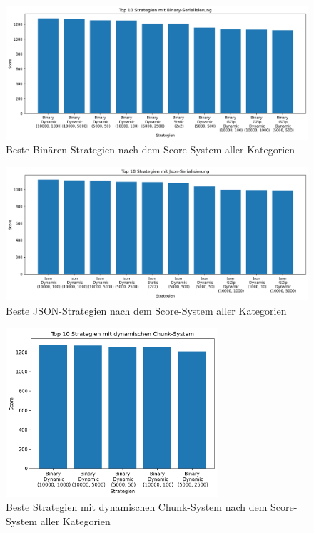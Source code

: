 \begin{figure}[htp]
    \centering
    \includegraphics[width=1\textwidth]{images/plots/Binary.png}
    \caption{Beste Binären-Strategien nach dem Score-System aller Kategorien}
    \label{fig:topStratBin}
\end{figure}

\begin{figure}[htp]
    \centering
    \includegraphics[width=1\textwidth]{images/plots/Json.png}
    \caption{Beste JSON-Strategien nach dem Score-System aller Kategorien}
    \label{fig:topStratJson}
\end{figure}

\begin{figure}[htp]
    \centering
    \includegraphics[width=0.7\textwidth]{images/plots/dynamisch.png}
    \caption{Beste Strategien mit dynamischen Chunk-System nach dem Score-System aller Kategorien}
    \label{fig:topDynamic}
\end{figure}

